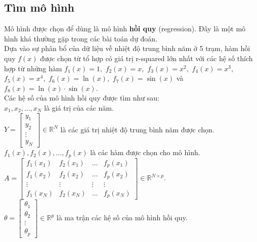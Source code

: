 \documentclass[a4paper]{article}
\begin{document}
\subsection{Tìm mô hình}
Mô hình được chọn để dùng là mô hình \textbf{hồi quy} (regression). Đây là một mô hình khá thường gặp trong các bài toán dự đoán.\\ 
Dựa vào sự phân bổ của dữ liệu về nhiệt độ trung bình năm ở 5 trạm, hàm hồi quy $f \left( x \right)$ được chọn từ tổ hợp có giá trị r-squared lớn nhất với các hệ số thích hợp từ những hàm ${f_1}\left( x \right) = 1,$ ${f_2}\left( x \right) = x,$ ${f_3}\left( x \right) = {x^2},$ ${f_4}\left( x \right) = {x^3},$ ${f_5}\left( x \right) = {x^4},$ ${f_6}\left( x \right) = \ln \left( x \right),$ ${f_7}\left( x \right) = \sin \left( x \right)$ và ${f_8}\left( x \right) = \ln \left( x \right) \cdot \sin \left( x \right).$\\
Các hệ số của mô hình hồi quy được tìm như sau:\\
$x_1, x_2, ..., x_N$ là giá trị của các năm.\\
$Y = \left[ {\begin{array}{*{20}{c}}
  {{y_1}} \\ 
  {{y_2}} \\ 
   \vdots  \\ 
  {{y_N}} 
\end{array}} \right] \in {\mathbb{R}^N}$ là các giá trị nhiệt độ trung bình năm được chọn.\\
${f_1}\left( x \right),{f_2}\left( x \right), \ldots ,{f_p}\left( x \right)$ là các hàm được chọn cho mô hình.\\
$A = \left[ {\begin{array}{*{20}{c}}
  {{f_1}\left( {{x_1}} \right)}&{{f_2}\left( {{x_1}} \right)}& \ldots &{{f_p}\left( {{x_1}} \right)} \\ 
  {{f_1}\left( {{x_2}} \right)}&{{f_2}\left( {{x_2}} \right)}& \ldots &{{f_p}\left( {{x_2}} \right)} \\ 
   \vdots & \vdots & \vdots & \vdots  \\ 
  {{f_1}\left( {{x_N}} \right)}&{{f_2}\left( {{x_N}} \right)}& \ldots &{{f_p}\left( {{x_N}} \right)} 
\end{array}} \right] \in {\mathbb{R}^{N \times p}}.$\\
$\theta  = \left[ {\begin{array}{*{20}{c}}
  {{\theta _1}} \\ 
  {{\theta _2}} \\ 
   \vdots  \\ 
  {{\theta _p}} 
\end{array}} \right] \in {\mathbb{R}^p}$ là ma trận các hệ số của mô hình hồi quy.
\end{document}

